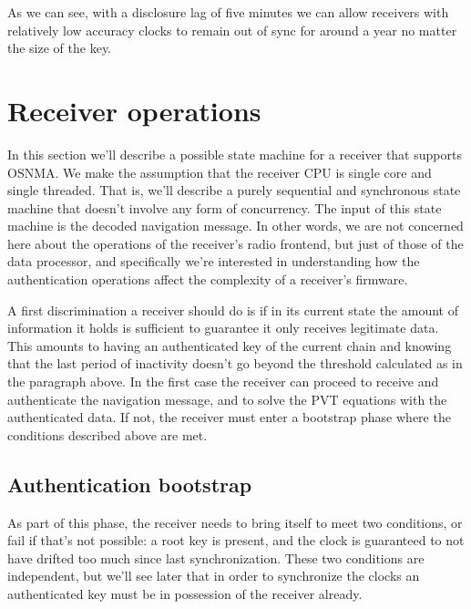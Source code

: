 As we can see, with a disclosure lag of five minutes we can allow receivers with
relatively low accuracy clocks to remain out of sync for around a year no matter
the size of the key.

\section{Receiver operations}
In this section we'll describe a possible state machine for a receiver that
supports OSNMA. We make the assumption that the receiver CPU is single core and
single threaded. That is, we'll describe a purely sequential and synchronous
state machine that doesn't involve any form of concurrency. The input of this
state machine is the decoded navigation message. In other words, we are not
concerned here about the operations of the receiver's radio frontend, but just
of those of the data processor, and specifically we're interested in
understanding how the authentication operations affect the complexity of a
receiver's firmware.

A first discrimination a receiver should do is if in its current state the
amount of information it holds is sufficient to guarantee it only receives
legitimate data. This amounts to having an authenticated key of the current
chain and knowing that the last period of inactivity doesn't go beyond the
threshold calculated as in the paragraph above. In the first case the receiver
can proceed to receive and authenticate the navigation message, and to solve the
PVT equations with the authenticated data. If not, the receiver must enter a
bootstrap phase where the conditions described above are met.

\subsection{Authentication bootstrap}
As part of this phase, the receiver needs to bring itself to meet two
conditions, or fail if that's not possible: a root key is present, and the clock
is guaranteed to not have drifted too much since last synchronization. These two
conditions are independent, but we'll see later that in order to synchronize the
clocks an authenticated key must be in possession of the receiver already.

